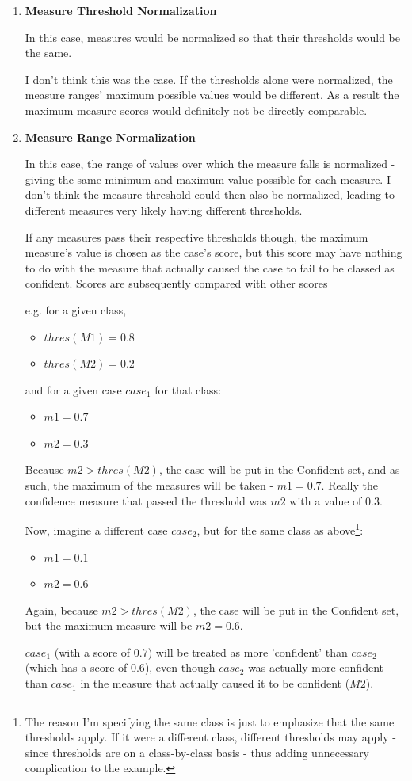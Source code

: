 \documentclass[a4paper,11pt]{report}
\begin{document}
\begin{enumerate}
	\item \textbf{Measure Threshold Normalization}
	
	In this case, measures would be normalized so that their thresholds would be the same.
	
	I don't think this was the case. If the thresholds alone were normalized, the measure ranges' maximum possible values would be different. As a result the maximum measure scores would definitely not be directly comparable.
	
	\item \textbf{Measure Range Normalization}
	
	In this case, the range of values over which the measure falls is normalized - giving the same minimum and maximum value possible for each measure. I don't think the measure threshold could then also be normalized, leading to different measures very likely having different thresholds. 
	
	If any measures pass their respective thresholds though, the maximum measure's value is chosen as the case's score, but this score may have nothing to do with the measure that actually caused the case to fail to be classed as confident. Scores are subsequently compared with other scores
	
	e.g. for a given class, 
	\begin{itemize}
		\item $thres(M1) = 0.8$
		\item $thres(M2) = 0.2$
	\end{itemize}
	and for a given case $case_{1}$ for that class:
	\begin{itemize}
		\item $m1 = 0.7$
		\item $m2 = 0.3$
	\end{itemize}  
	
	Because $m2 > thres(M2)$, the case will be put in the Confident set, and as such, the maximum of the measures will be taken - $m1=0.7$. Really the confidence measure that passed the threshold was $m2$ with a value of $0.3$.
	
	Now, imagine a different case $case_{2}$, but for the same class as above\footnote{The reason I'm specifying the same class is just to emphasize that the same thresholds apply. If it were a different class, different thresholds may apply - since thresholds are on a class-by-class basis - thus adding unnecessary complication to the example.}:
	\begin{itemize}
		\item $m1 = 0.1$
		\item $m2 = 0.6$
	\end{itemize}
	Again, because $m2 > thres(M2)$, the case will be put in the Confident set, but the maximum measure will be $m2 = 0.6$. 
	
	$case_{1}$ (with a score of $0.7$) will be treated as more 'confident' than $case_{2}$ (which has a score of $0.6$), even though $case_{2}$ was actually more confident than $case_{1}$ in the measure that actually caused it to be confident ($M2$).
	
\end{enumerate}
\end{document}
